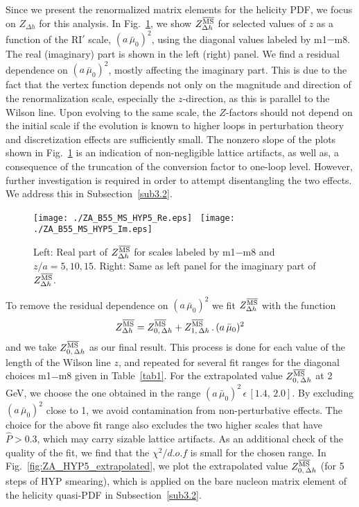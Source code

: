 \documentclass[12pt,tighten,nofootinbib,amssymb,floatfix]{article}
\newcommand{\MSb}{{\overline{\rm MS}}}
\newcommand{\be}{\begin{equation}}
\newcommand{\ee}{\end{equation}}
\begin{document}
Since we present the renormalized matrix elements for the helicity PDF, we focus on $Z_{\Delta h}$ for this analysis. In Fig.~\ref{fig:Za_vs_scale},
we show $Z^{\MSb}_{\Delta h}$ for selected values of $z$ as a function of the RI$'$ scale, $(a\,\bar\mu_0)^2$, using the
diagonal values labeled by m1$-$m8. The real (imaginary) part is shown in the left (right) panel. We find a residual dependence on $(a\,\bar\mu_0)^2$, 
mostly affecting the imaginary part. This is due to the fact that the vertex function depends not only on the magnitude and direction of the renormalization
scale, especially the $z$-direction, as this is parallel to the Wilson line. Upon evolving to the same scale, the $Z$-factors should not depend on the initial scale
if the evolution is known to higher loops in perturbation theory and discretization effects are sufficiently small. The nonzero slope of the plots shown in 
Fig.~\ref{fig:Za_vs_scale} is an indication of non-negligible lattice artifacts, as well as, a consequence of the truncation of the conversion factor to one-loop level. 
However, further investigation is required in order to attempt disentangling the two effects. We address this in Subsection~\ref{sub3.2}.
\begin{figure}[!h]
\centering
\texttt{[image: ./ZA\_B55\_MS\_HYP5\_Re.eps]}\,\,\,
\texttt{[image: ./ZA\_B55\_MS\_HYP5\_Im.eps]}
\vspace*{-0.3cm}
\begin{minipage}{15cm}
\hspace*{3cm}
\caption{\small{Left: Real part of $Z^\MSb_{\Delta h}$ for scales labeled by m1$-$m8 and $z/a{=}5,10,15$.  
Right: Same as left panel for the imaginary part of $Z^\MSb_{\Delta h}$.}}
\label{fig:Za_vs_scale} 
\end{minipage}
\end{figure}

\vspace*{0.15cm}
\noindent
To remove the residual dependence on $(a\,\bar\mu_0)^2$ we fit $Z^{\MSb}_{\Delta h} $ with the function
\be
\label{eq:extrapol}
Z^{\MSb}_{\Delta h}  = Z_{0, \,{\Delta h}}^{\MSb}  + Z_{1, \,{\Delta h}}^{\MSb} \, .\,(a\,\bar\mu_0)^2
\ee
and we take $Z_{0, \,{\Delta h}}^{\MSb}$ as our final result. This process is done for each value of 
the length of the Wilson line $z$, and repeated for several fit ranges for the diagonal choices m1$-$m8 given in Table~\ref{tab1}.
For the extrapolated value $Z_{0, \,{\Delta h}}^{\MSb}$ at 2 GeV, we choose the one obtained in the range 
$(a\,\bar\mu_0)^2\,\epsilon\, [1.4,\,2.0]$. By excluding $(a\,\bar\mu_0)^2$ close to 1, we avoid contamination from non-perturbative 
effects. The choice for the above fit range also excludes the two higher scales that have $\hat{P}{>}0.3$, which may carry sizable lattice artifacts. 
As an additional check of the quality of the fit, we find that the $\chi^2/d.o.f$ is small for the chosen range.
In Fig.~\ref{fig:ZA_HYP5_extrapolated}, we plot the extrapolated value $Z_{0, \,{\Delta h}}^{\MSb}$ (for 5 steps of HYP smearing), which 
is applied on the bare nucleon matrix element of the helicity quasi-PDF in Subsection~\ref{sub3.2}.
\end{document}
